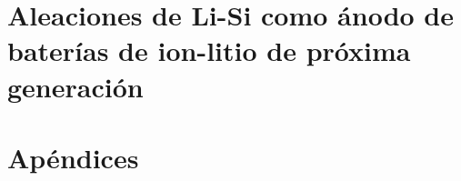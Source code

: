 \documentclass[12pt,spanish,a4paper,twoside]{book}
\begin{document}

% 

% 


\part{Aleaciones de Li-Si como ánodo de baterías de ion-litio de próxima generación}



% 

% 

% 

%
%
%

\part{Apéndices}

\appendix
\renewcommand\chaptername{Apéndice}




\end{document}
